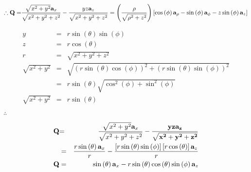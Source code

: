\documentclass{article}
\begin{document}
$\therefore \mathbf{Q=}\dfrac{\sqrt{x^{2}+y^{2}}\mathbf{a}_{x}}{\sqrt{%
x^{2}+y^{2}+z^{2}}}-\dfrac{yz\mathbf{a}_{z}}{\sqrt{x^{2}+y^{2}+z^{2}}}%
=\left( \dfrac{\rho }{\sqrt{\rho ^{2}+z^{2}}}\right) \left[ \cos \left( \phi
\right) \mathbf{a}_{\rho }-\sin \left( \phi \right) \mathbf{a}_{\phi }-z\sin
\left( \phi \right) \mathbf{a}_{z}\right] $

\begin{eqnarray*}
y &=&r\sin \left( \theta \right) \sin \left( \phi \right) \\
z &=&r\cos \left( \theta \right) \\
r &=&\sqrt{x^{2}+y^{2}+z^{2}} \\
\sqrt{x^{2}+y^{2}} &=&\sqrt{\left( r\sin \left( \theta \right) \cos \left(
\phi \right) \right) ^{2}+\left( r\sin \left( \theta \right) \sin \left(
\phi \right) \right) ^{2}} \\
&=&r\sin \left( \theta \right) \sqrt{\cos ^{2}\left( \phi \right) +\sin
^{2}\left( \phi \right) } \\
\sqrt{x^{2}+y^{2}} &=&r\sin \left( \theta \right)
\end{eqnarray*}

$\therefore $

\begin{eqnarray*}
\mathbf{Q} &\mathbf{=}&\dfrac{\sqrt{x^{2}+y^{2}}\mathbf{a}_{x}}{\sqrt{%
x^{2}+y^{2}+z^{2}}}-\mathbf{\dfrac{yz\mathbf{a}_{z}}{\sqrt{x^{2}+y^{2}+z^{2}}%
}} \\
&=&\dfrac{r\sin \left( \theta \right) \mathbf{a}_{x}}{r}-\dfrac{\left[ r\sin
\left( \theta \right) \sin \left( \phi \right) \right] \left[ r\cos \left(
\theta \right) \right] \mathbf{a}_{z}}{r} \\
\mathbf{Q} &=&\sin \left( \theta \right) \mathbf{a}_{x}-r\sin \left( \theta
\right) \cos \left( \theta \right) \sin \left( \phi \right) \mathbf{a}_{z}
\end{eqnarray*}
\end{document}
